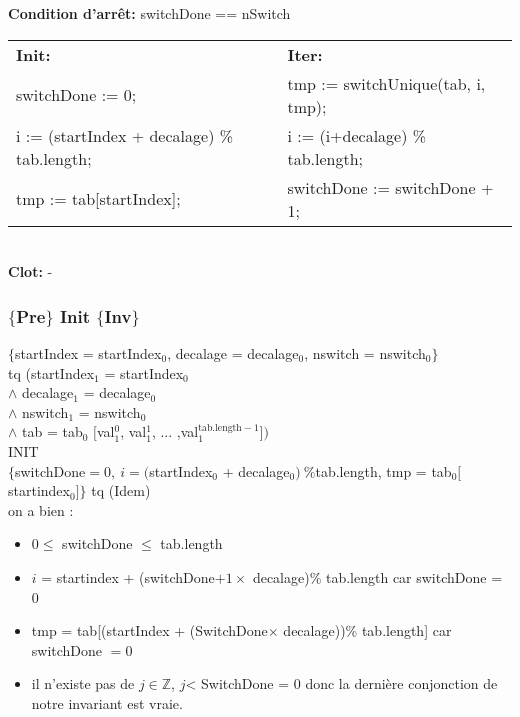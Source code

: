 \noindent \textbf{Condition d'arrêt:} switchDone == nSwitch\\

\noindent \begin{tabular}{l|l}
\textbf{Init:} & \textbf{Iter: }\\
switchDone := 0; & tmp := switchUnique(tab, i, tmp);\\
i := (startIndex + decalage) \% tab.length; & i := (i+decalage) \% tab.length;\\
tmp := tab[startIndex]; & switchDone := switchDone + 1;\\
\end{tabular}\\

\noindent \textbf{Clot: } -\\

\subsubsection*{$\{$Pre$\}$ Init $\{$Inv$\}$}

$\{$startIndex = startIndex$_{0}$, decalage = decalage$_{0}$, nswitch = nswitch$_{0} \}$\\
tq (startIndex$_{1}$ = startIndex$_{0}$ \\
$\wedge$ decalage$_{1}$ = decalage$_{0}$\\
$\wedge$ nswitch$_{1}$ = nswitch$_{0}$\\
$\wedge$ tab = tab$_{0}$ $[$val$_{1}^{0}$, val$_{1}^{1}$, ... ,val$_{1}^{\mathrm{tab.length-1}}])$\\

INIT \\

$\{$switchDone$ = 0,\ i = ($startIndex$_0$ + decalage$_0)\ \% $tab.length, tmp = tab$_0[$startindex$_0]\}$ tq (Idem)\\
on a bien : 
\begin{itemize}
	\item $0\leq$ switchDone $\leq$ tab.length
	\item $i$ = startindex + (switchDone$+1\times$ decalage)\% tab.length car switchDone = 0
	\item tmp = tab[(startIndex + (SwitchDone$\times$ decalage))\% tab.length] car switchDone $= 0$
	\item il n'existe pas de $j \in \mathbb{Z}$, $j$< SwitchDone = 0 donc la dernière conjonction de notre invariant est vraie. \\
\end{itemize}


